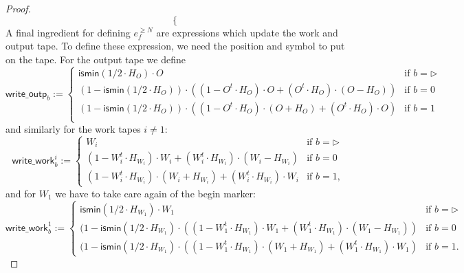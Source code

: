 \begin{proof}
$$\begin{cases}
\end{cases}
$$
A final ingredient for defining $e_f^{\geq N}$ are expressions which update the work and output tape.
To define these expression, we need the position and symbol to put on the tape. For the output tape we define
$$
\mathsf{write\_outp}_b:=\begin{cases}
\mathsf{ismin}(1/2\cdot H_O)\cdot O & \text{if $b=\rhd$}\\
(1-\mathsf{ismin}(1/2\cdot H_O))\cdot\left((1-O^t\cdot H_O)\cdot O + (O^t\cdot H_O)\cdot (O-H_O)\right) &\text{if $b=0$}\\
(1-\mathsf{ismin}(1/2\cdot H_O))\cdot\left((1-O^t\cdot H_O)\cdot (O+H_O) + (O^t\cdot H_O)\cdot O\right) &\text{if $b=1$}\\
\end{cases}
$$
and similarly for the work tapes $i\neq 1$:
$$
\mathsf{write\_work}_b^i:=\begin{cases}
W_i & \text{if $b=\rhd$}\\
(1-W_i^t\cdot H_{W_i})\cdot W_i + (W_i^t\cdot H_{W_i})\cdot (W_i-H_{W_i}) &\text{if $b=0$}\\
(1-W_i^t\cdot H_{W_i})\cdot (W_i+H_{W_i}) + (W_i^t\cdot H_{W_i})\cdot W_i &\text{if $b=1$},
\end{cases}
$$
and for  $W_1$ we have to take care again of the begin marker:
$$
\mathsf{write\_work}_b^1:=\begin{cases}
\mathsf{ismin}(1/2\cdot H_{W_1})\cdot W_1 & \text{if $b=\rhd$}\\
(1-\mathsf{ismin}(1/2\cdot H_{W_1})\cdot\left((1-W_1^t\cdot H_{W_1})\cdot W_1 + (W_1^t\cdot H_{W_1})\cdot (W_1-H_{W_1})\right) &\text{if $b=0$}\\
(1-\mathsf{ismin}(1/2\cdot H_{W_1})\cdot\left((1-W_1^t\cdot H_{W_1})\cdot (W_1+H_{W_1}) + (W_1^t\cdot H_{W_1})\cdot W_1\right) &\text{if $b=1$}.
\end{cases}
$$





\end{proof}
